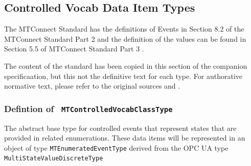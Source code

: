 \FloatBarrier
\subsection{Controlled Vocab Data Item Types} \label{model:ControlledVocabDataItemTypes}

The MTConnect Standard has the definitions of Events in 
Section 8.2 of the MTConnect Standard Part 2 \cite{MTCPart2} and the 
definition of the values can be found in Section 5.5 of MTConnect Standard Part 3 \cite{MTCPart3}. 

The content of the standard has been copied in this section of the companion specificaation,
but this not the definitive text for each type. For authorative normative text, please refer 
to the original sources \cite{MTCPart2} and \cite{MTCPart3}.

\subsubsection{Defintion of \texttt{ MTControlledVocabClassType}}
  \label{type:MTControlledVocabClassType}

\FloatBarrier

The abstract base type for controlled events that represent states that are provided
in related enumerations. These data items will be represented in an object of
type \texttt{MTEnumeratedEventType} derived from the OPC UA type
\texttt{MultiStateValueDiscreteType}

